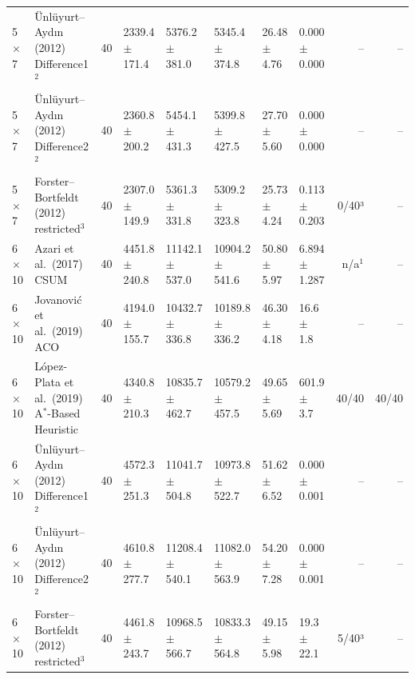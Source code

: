 \begin{table}[htbp]
\begin{tabular}{llrlllllrr}
5$\times$7 & \"{U}nl\"{u}yurt--Ayd\i{}n (2012) Difference1$^{2}$ & 40 & 2339.4 $\pm$ 171.4 & 5376.2 $\pm$ 381.0 & 5345.4 $\pm$ 374.8 & 26.48 $\pm$ 4.76 & 0.000 $\pm$ 0.000 & -- & -- \\
5$\times$7 & \"{U}nl\"{u}yurt--Ayd\i{}n (2012) Difference2$^{2}$ & 40 & 2360.8 $\pm$ 200.2 & 5454.1 $\pm$ 431.3 & 5399.8 $\pm$ 427.5 & 27.70 $\pm$ 5.60 & 0.000 $\pm$ 0.000 & -- & -- \\
5$\times$7 & Forster--Bortfeldt (2012) restricted$^{3}$ & 40 & 2307.0 $\pm$ 149.9 & 5361.3 $\pm$ 331.8 & 5309.2 $\pm$ 323.8 & 25.73 $\pm$ 4.24 & 0.113 $\pm$ 0.203 & 0/40³ & -- \\
\midrule
6$\times$10 & Azari et al.\ (2017) CSUM & 40 & 4451.8 $\pm$ 240.8 & 11142.1 $\pm$ 537.0 & 10904.2 $\pm$ 541.6 & 50.80 $\pm$ 5.97 & 6.894 $\pm$ 1.287 & n/a$^{1}$ & -- \\
6$\times$10 & Jovanovi\'{c} et al.\ (2019) ACO & 40 & 4194.0 $\pm$ 155.7 & 10432.7 $\pm$ 336.8 & 10189.8 $\pm$ 336.2 & 46.30 $\pm$ 4.18 & 16.6 $\pm$ 1.8 & -- & -- \\
6$\times$10 & L\'{o}pez-Plata et al.\ (2019) A$^\ast$-Based Heuristic & 40 & 4340.8 $\pm$ 210.3 & 10835.7 $\pm$ 462.7 & 10579.2 $\pm$ 457.5 & 49.65 $\pm$ 5.69 & 601.9 $\pm$ 3.7 & 40/40 & 40/40 \\
6$\times$10 & \"{U}nl\"{u}yurt--Ayd\i{}n (2012) Difference1$^{2}$ & 40 & 4572.3 $\pm$ 251.3 & 11041.7 $\pm$ 504.8 & 10973.8 $\pm$ 522.7 & 51.62 $\pm$ 6.52 & 0.000 $\pm$ 0.001 & -- & -- \\
6$\times$10 & \"{U}nl\"{u}yurt--Ayd\i{}n (2012) Difference2$^{2}$ & 40 & 4610.8 $\pm$ 277.7 & 11208.4 $\pm$ 540.1 & 11082.0 $\pm$ 563.9 & 54.20 $\pm$ 7.28 & 0.000 $\pm$ 0.001 & -- & -- \\
6$\times$10 & Forster--Bortfeldt (2012) restricted$^{3}$ & 40 & 4461.8 $\pm$ 243.7 & 10968.5 $\pm$ 566.7 & 10833.3 $\pm$ 564.8 & 49.15 $\pm$ 5.98 & 19.3 $\pm$ 22.1 & 5/40³ & -- \\
\bottomrule
\end{tabular}

\end{table}
